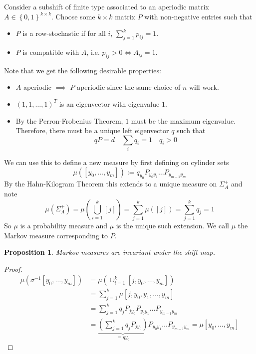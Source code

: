 \documentclass[11pt]{article}
\newcommand{\defeq}{:=}
\newcommand{\mdf}[1]{{\color{red} #1}}
\newtheorem{prop}{Proposition}[section]
\begin{document}
Consider a subshift of finite type associated to an aperiodic matrix $A\in\left\{ 0, 1\right\}^{k\times k}$.
Choose some $k\times k$ matrix $P$ with non-negative entries such that
\begin{itemize}
	\item $P$ is a \mdf{row-stochastic} if for all $i$, $\sum_{j=1}^k p_{ij} =1$.
	\item $P$ is \mdf{compatible with $A$}, i.e. $p_{ij} >0 \iff A_{ij}=1$.
\end{itemize}

Note that we get the following desirable properties:
\begin{itemize}
	\item $A$ aperiodic $\implies$ $P$ aperiodic since the same choice of $n$ will work.
	\item $(1, 1, \dots, 1)^T$ is an eigenvector with eigenvalue $1$.
	\item By the Perron-Frobenius Theorem, $1$ must be the maximum eigenvalue.
		Therefore, there must be a unique left eigenvector $q$ such that
		\[
			qP = d \quad \sum_{i}q_i = 1\quad q_i >0
		\]
\end{itemize}
We can use this to define a new measure by first defining on cylinder sets
\[
	\mu(\left[ y_0, \dots, y_m \right]) \defeq q_{y_0}P_{y_0 y_1}\dots P_{y_{m-1}y_m}
\]
By the Hahn-Kilogram Theorem this extends to a unique measure on $\Sigma_A^+$ and note
\[
	\mu(\Sigma_A^+)=\mu\left( \bigcup_{i=1}^k [j] \right)=\sum_{j=1}^k \mu( \left[ j\right]) = \sum_{j=1}^k q_j =1
\]
So $\mu$ is a probability measure and $\mu$ is the unique such extension.
We call $\mu$ the \mdf{Markov measure corresponding to $P$}.

\begin{prop}
Markov measures are invariant under the shift map.
\end{prop}

\begin{proof}
\begin{align*}
	\mu(\sigma^{-1}[y_0, \dots, y_m]) &= \mu\left( \cup_{i=1}^k [j, y_0, \dots, y_m]\right) \\
									  &= \sum_{j=1}^k\mu[j, y_0, y_1, \dots, y_m] \\
									  &= \sum_{j=1}^k q_jP_{j y_0} P_{y_0 y_1} \dots P_{y_{m-1} y_m} \\
									  &= \underbrace{\left( \sum_{j=1}^k q_j P_{j y_0}\right)}_{=qy_0}P_{y_0 y_1} \dots P_{y_{m-1} y_m}
									  = \mu[y_0, \dots, y_m]
\end{align*}
\end{proof}
\end{document}
